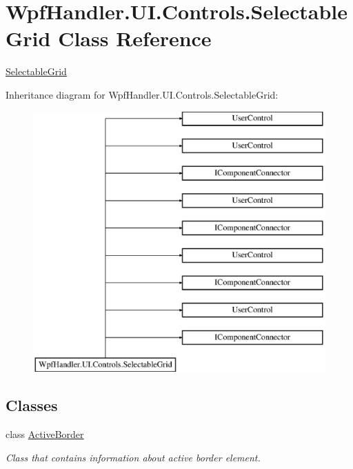 \hypertarget{class_wpf_handler_1_1_u_i_1_1_controls_1_1_selectable_grid}{}\section{Wpf\+Handler.\+U\+I.\+Controls.\+Selectable\+Grid Class Reference}
\label{class_wpf_handler_1_1_u_i_1_1_controls_1_1_selectable_grid}


\mbox{\hyperlink{class_wpf_handler_1_1_u_i_1_1_controls_1_1_selectable_grid}{Selectable\+Grid}}  


Inheritance diagram for Wpf\+Handler.\+U\+I.\+Controls.\+Selectable\+Grid\+:\begin{figure}[H]
\begin{center}
\leavevmode
\includegraphics[height=10.000000cm]{de/dc7/class_wpf_handler_1_1_u_i_1_1_controls_1_1_selectable_grid}
\end{center}
\end{figure}
\subsection*{Classes}
\begin{DoxyCompactItemize}
\item 
class \mbox{\hyperlink{class_wpf_handler_1_1_u_i_1_1_controls_1_1_selectable_grid_1_1_active_border}{Active\+Border}}
\begin{DoxyCompactList}\small\item\em Class that contains information about active border element. \end{DoxyCompactList}\end{DoxyCompactItemize}
